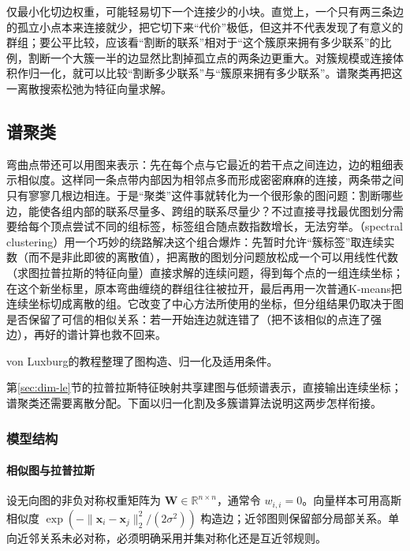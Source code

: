 仅最小化切边权重，可能轻易切下一个连接少的小块。直觉上，一个只有两三条边的孤立小点本来连接就少，把它切下来“代价”极低，但这并不代表发现了有意义的群组；要公平比较，应该看“割断的联系”相对于“这个簇原来拥有多少联系”的比例，割断一个大簇一半的边显然比割掉孤立点的两条边更重大。对簇规模或连接体积作归一化，就可以比较“割断多少联系”与“簇原来拥有多少联系”。谱聚类再把这一离散搜索松弛为特征向量求解。
\subsection{谱聚类}
\label{sec:clustering-spectral}

弯曲点带还可以用图来表示：先在每个点与它最近的若干点之间连边，边的粗细表示相似度。这样同一条点带内部因为相邻点多而形成密密麻麻的连接，两条带之间只有寥寥几根边相连。于是“聚类”这件事就转化为一个很形象的图问题：割断哪些边，能使各组内部的联系尽量多、跨组的联系尽量少？不过直接寻找最优图划分需要给每个顶点尝试不同的组标签，标签组合随点数指数增长，无法穷举。（spectral clustering）用一个巧妙的绕路解决这个组合爆炸：先暂时允许“簇标签”取连续实数（而不是非此即彼的离散值），把离散的图划分问题放松成一个可以用线性代数（求图拉普拉斯的特征向量）直接求解的连续问题，得到每个点的一组连续坐标；在这个新坐标里，原本弯曲缠绕的群组往往被拉开，最后再用一次普通K-means把连续坐标切成离散的组。它改变了中心方法所使用的坐标，但分组结果仍取决于图是否保留了可信的相似关系：若一开始连边就连错了（把不该相似的点连了强边），再好的谱计算也救不回来。

von Luxburg的教程整理了图构造、归一化及适用条件。

第\ref{sec:dim-le}节的拉普拉斯特征映射共享建图与低频谱表示，直接输出连续坐标；谱聚类还需要离散分配。下面以归一化割及多簇谱算法说明这两步怎样衔接。

\subsubsection{模型结构}

\paragraph{相似图与拉普拉斯}

设无向图的非负对称权重矩阵为 $\bm{W}\in\mathbb{R}^{n\times n}$，通常令 $w_{i,i}=0$。向量样本可用高斯相似度 $\exp(-\lVert\bm{x}_i-\bm{x}_j\rVert_2^2/(2\sigma^2))$ 构造边；近邻图则保留部分局部关系。单向近邻关系未必对称，必须明确采用并集对称化还是互近邻规则。

